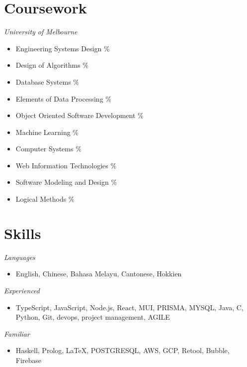 \documentclass[10pt, a4paper]{cv}
\begin{document}
\begin{paracol}{2}
\begin{flushleft}
		\section*{Coursework}
		 {\sl University of Melbourne}
		\begin{itemize} \itemsep -2pt
			\item Engineering Systems Design \%
			\item  Design of Algorithms \%
			\item  Database Systems \%
			\item Elements of Data Processing \%
			\item Object Oriented Software Development \%
			\item Machine Learning \%
			\item Computer Systems \%
			\item Web Information Technologies \%
			\item Software Modeling and Design \%
			\item Logical Methods \%
		\end{itemize}

		\section*{Skills}
		 {\sl Languages}
		\begin{itemize}[label={}, leftmargin=1em, topsep=0pt, after=\vspace{6pt}]
			\item English, Chinese, Bahasa Melayu, Cantonese, Hokkien
		\end{itemize}
		{\sl Experienced}
		\begin{itemize}[label={}, leftmargin=1em,  topsep=0pt, after=\vspace{6pt}]
			\item TypeScript, JavaScript, Node.js, React, MUI, PRISMA, MYSQL, Java, C, Python, Git, devops, project management, AGILE
		\end{itemize}
		{\sl Familiar}
		\begin{itemize}[label={}, leftmargin=1em, topsep=0pt]
			\item Haskell, Prolog, \LaTeX, POSTGRESQL, AWS, GCP, Retool, Bubble, Firebase
		\end{itemize}

		\switchcolumn


\end{flushleft}
\end{paracol}
\end{document}
